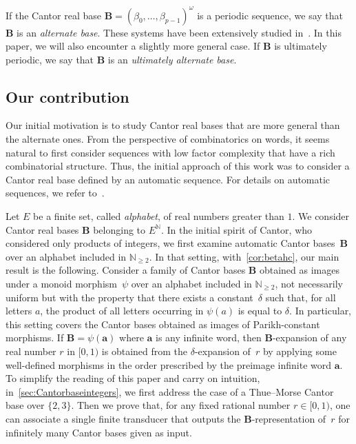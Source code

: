 \documentclass[12pt,reqno]{amsart}
\newcommand{\B}{{\mathbf{B}}}
\begin{document}
\begin{definition}
   If the Cantor real base $\B=(\beta_0,\ldots,\beta_{p-1})^\omega$ is a periodic sequence, we say that $\B$ is an {\em alternate base}. These systems have been extensively studied in~\cite{CC2021,CCK,CCD,CCMP}. In this paper, we will also encounter a slightly more general case. If $\B$ is ultimately periodic, we say that $\B$ is an {\em ultimately alternate base}.
\end{definition}


\subsection{Our contribution}
Our initial motivation is to study Cantor real bases that are more general than the alternate ones. From the perspective of combinatorics on words, it seems natural to first consider sequences with low factor complexity that have a rich combinatorial structure. Thus, the initial approach of this work was to consider a Cantor real base defined by an automatic sequence. For details on automatic sequences, we refer to~\cite{AS03}.

Let $E$ be a finite set, called {\em alphabet}, of real numbers greater than $1$. We consider Cantor real bases $\B$ belonging to $E^{\mathbb{N}}$. In the initial spirit of Cantor, who considered only products of integers, we first examine automatic Cantor bases~$\B$ over an alphabet included in $\mathbb{N}_{\ge 2}$. In that setting, with~\cref{cor:betahc}, our main result is the following. Consider a family of Cantor bases $\B$ obtained as images under a monoid morphism~$\psi$ over an alphabet included in $\mathbb{N}_{\ge 2}$, not necessarily uniform but with the property that there exists a constant~$\delta$ such that, for all letters $a$, the product of all letters occurring in $\psi(a)$ is equal to $\delta$. In particular, this setting covers the Cantor bases obtained as images of Parikh-constant morphisms. If $\B=\psi(\mathbf{a})$ where $\mathbf{a}$ is any infinite word, then $\B$-expansion of any real number $r$ in $[0,1)$ is obtained from the $\delta$-expansion of~$r$ by applying some well-defined morphisms in the order prescribed by the preimage infinite word $\mathbf{a}$. To simplify the reading of this paper and carry on intuition,  in~\cref{sec:Cantorbaseintegers}, we first address the case of a Thue--Morse Cantor base over $\{2,3\}$.  
Then we prove that, for any fixed rational number $r\in [0,1)$, one can associate a single finite transducer that outputs the $\B$-representation of~$r$ for infinitely many Cantor bases given as input.
\end{document}

